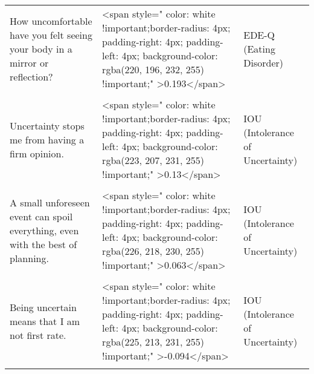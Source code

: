 \documentclass[border=1mm]{standalone}
\begin{document}
\begin{longtable}{lll}
How uncomfortable have you felt seeing your body in a mirror or reflection? & <span style="     color: white !important;border-radius: 4px; padding-right: 4px; padding-left: 4px; background-color: rgba(220, 196, 232, 255) !important;" >0.193</span> & EDE-Q (Eating Disorder)\\
\cellcolor{gray!10}{How uncomfortable have you felt about others seeing your shape or figure?} & \cellcolor{gray!10}{<span style="     color: white !important;border-radius: 4px; padding-right: 4px; padding-left: 4px; background-color: rgba(218, 186, 233, 255) !important;" >0.249</span>} & \cellcolor{gray!10}{EDE-Q (Eating Disorder)}\\
\addlinespace
Uncertainty stops me from having a firm opinion. & <span style="     color: white !important;border-radius: 4px; padding-right: 4px; padding-left: 4px; background-color: rgba(223, 207, 231, 255) !important;" >0.13</span> & IOU (Intolerance of Uncertainty)\\
\cellcolor{gray!10}{One should always look ahead so as to avoid surprises.} & \cellcolor{gray!10}{<span style="     color: white !important;border-radius: 4px; padding-right: 4px; padding-left: 4px; background-color: rgba(226, 216, 230, 255) !important;" >0.077</span>} & \cellcolor{gray!10}{IOU (Intolerance of Uncertainty)}\\
A small unforeseen event can spoil everything, even with the best of planning. & <span style="     color: white !important;border-radius: 4px; padding-right: 4px; padding-left: 4px; background-color: rgba(226, 218, 230, 255) !important;" >0.063</span> & IOU (Intolerance of Uncertainty)\\
\cellcolor{gray!10}{When it's time to act, uncertainty paralyses me.} & \cellcolor{gray!10}{<span style="     color: white !important;border-radius: 4px; padding-right: 4px; padding-left: 4px; background-color: rgba(227, 222, 230, 255) !important;" >-0.039</span>} & \cellcolor{gray!10}{IOU (Intolerance of Uncertainty)}\\
Being uncertain means that I am not first rate. & <span style="     color: white !important;border-radius: 4px; padding-right: 4px; padding-left: 4px; background-color: rgba(225, 213, 231, 255) !important;" >-0.094</span> & IOU (Intolerance of Uncertainty)\\
\addlinespace
\cellcolor{gray!10}{When I am uncertain, I can't go forward.} & \cellcolor{gray!10}{<span style="     color: white !important;border-radius: 4px; padding-right: 4px; padding-left: 4px; background-color: rgba(226, 216, 230, 255) !important;" >-0.075</span>} & \cellcolor{gray!10}{IOU (Intolerance of Uncertainty)}\\

\end{longtable}
\end{document}
